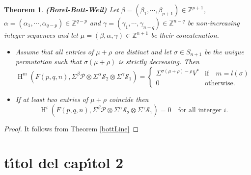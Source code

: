 \documentclass[a4paper,10pt]{book}
\newtheorem{thm0}[defn0]{Theorem}
\newenvironment{theorem}{\bigskip \begin{thm0}}{\end{thm0}}
\newcommand{\cP}{{\mathcal P}}
\newcommand {\ZZ}{\mathbb{Z}}
\newcommand{\cS}{{\mathcal S}}
\DeclareMathOperator{\Hl}{H}
\begin{document}
\begin{theorem}{\bf (Borel-Bott-Weil)}
\label{bott2} Let $ \beta=(\beta_1, \cdots, \beta_{p+1}) \in \ZZ^{p+1}$, $\alpha=(\alpha_1, \cdots, \alpha_{q-p}) \in \ZZ^{q-p}$ and $\gamma=(\gamma_1, \cdots, \gamma_{n-q}) \in \ZZ^{n-q}$
 be non-increasing integer sequences  and let $\mu=(\beta,\alpha, \gamma) \in \ZZ^{n+1}$ be their concatenation.

\begin{itemize}
\item[(a)] Assume that all entries of $\mu + \rho $ are distinct and let $\sigma \in S_{n+1}$ be the unique permutation such
    that $\sigma(\mu+\rho)$ is strictly decreasing. Then
\[ \Hl^m(F(p,q,n), \Sigma^{\beta} \cP \otimes \Sigma^{\alpha} \cS_2 \otimes \Sigma^{\gamma}\cS_1)= \left \{ \begin{array}{ll}
\Sigma^{\sigma(\mu+\rho)-\rho} V^* & \mbox{if} \quad m=l(\sigma) \\
0 &\mbox{otherwise.}
 \end{array} \right. \]
\item[(b)] If at least two entries of $\mu + \rho $ coincide then $$
\Hl^{i}(F(p,q,n), \Sigma^{\beta} \cP \otimes \Sigma^{\alpha} \cS_2 \otimes \Sigma^{\gamma}\cS_1)= 0 \quad \mbox{for all interger } i.$$
\end{itemize}
\end{theorem}
\begin{proof} It follows from Theorem \ref{bottLine}
\end{proof}

\chapter{t\'{\i}tol del cap\'{\i}tol 2}



\backmatter
{}

\end{document}

